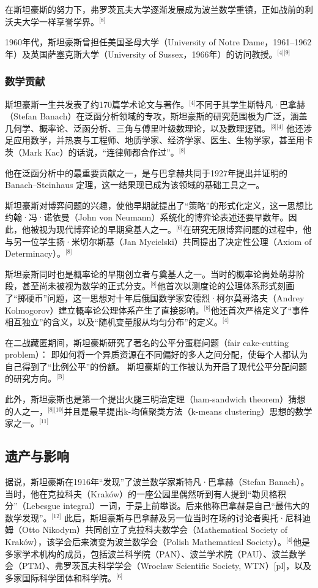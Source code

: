 在斯坦豪斯的努力下，弗罗茨瓦夫大学逐渐发展成为波兰数学重镇，正如战前的利沃夫大学一样享誉学界。\(^\text{[8]}\)

1960年代，斯坦豪斯曾担任美国圣母大学（University of Notre Dame，1961–1962年）及英国萨塞克斯大学（University of Sussex，1966年）的访问教授。\(^\text{[4][9]}\)
\subsubsection{数学贡献}
斯坦豪斯一生共发表了约170篇学术论文与著作。\(^\text{[4]}\)不同于其学生斯特凡·巴拿赫（Stefan Banach）在泛函分析领域的专攻，斯坦豪斯的研究范围极为广泛，涵盖几何学、概率论、泛函分析、三角与傅里叶级数理论，以及数理逻辑。\(^\text{[3][4]}\)  他还涉足应用数学，并热衷与工程师、地质学家、经济学家、医生、生物学家，甚至用卡茨（Mark Kac）的话说，“连律师都合作过”。\(^\text{[8]}\)

他在泛函分析中的最重要贡献之一，是与巴拿赫共同于1927年提出并证明的Banach–Steinhaus 定理，这一结果现已成为该领域的基础工具之一。

斯坦豪斯对博弈问题的兴趣，使他早期就提出了“策略”的形式化定义，这一思想比约翰·冯·诺依曼（John von Neumann）系统化的博弈论表述还要早数年。因此，他被视为现代博弈论的早期奠基人之一。\(^\text{[6]}\)在研究无限博弈问题的过程中，他与另一位学生扬·米切尔斯基（Jan Mycielski）共同提出了决定性公理（Axiom of Determinacy）。\(^\text{[8]}\)

斯坦豪斯同时也是概率论的早期创立者与奠基人之一。当时的概率论尚处萌芽阶段，甚至尚未被视为数学的正式分支。\(^\text{[8]}\)他首次以测度论的公理体系形式刻画了“掷硬币”问题，这一思想对十年后俄国数学家安德烈·柯尔莫哥洛夫（Andrey Kolmogorov）建立概率论公理体系产生了直接影响。\(^\text{[8]}\)他还首次严格定义了“事件相互独立”的含义，以及“随机变量服从均匀分布”的定义。\(^\text{[4]}\)

在二战藏匿期间，斯坦豪斯研究了著名的公平分蛋糕问题（fair cake-cutting problem）：  即如何将一个异质资源在不同偏好的多人之间分配，使每个人都认为自己得到了“比例公平”的份额。  斯坦豪斯的工作被认为开启了现代公平分配问题的研究方向。\(^\text{[B]}\)

此外，斯坦豪斯也是第一个提出火腿三明治定理（ham-sandwich theorem）猜想的人之一，\(^\text{[8][10]}\)并且是最早提出k-均值聚类方法（k-means clustering）思想的数学家之一。\(^\text{[11]}\)
\subsection{遗产与影响}
据说，斯坦豪斯在1916年“发现”了波兰数学家斯特凡·巴拿赫（Stefan Banach）。当时，他在克拉科夫（Kraków）的一座公园里偶然听到有人提到“勒贝格积分”（Lebesgue integral）一词，于是上前攀谈。后来他称巴拿赫是自己“最伟大的数学发现”。\(^\text{[12]}\) 此后，斯坦豪斯与巴拿赫及另一位当时在场的讨论者奥托·尼科迪姆（Otto Nikodym）共同创立了克拉科夫数学会（Mathematical Society of Kraków），该学会后来演变为波兰数学会（Polish Mathematical Society）。\(^\text{[4]}\)他是多家学术机构的成员，包括波兰科学院（PAN）、波兰学术院（PAU）、波兰数学会（PTM）、弗罗茨瓦夫科学学会（Wrocław Scientific Society, WTN）[pl]，以及多家国际科学团体和科学院。\(^\text{[6]}\)

